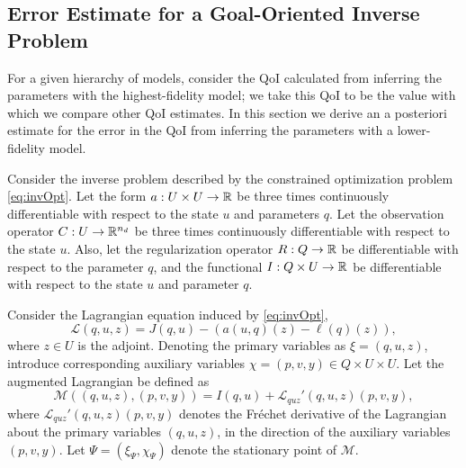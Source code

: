 \subsection[Error Estimate for a Goal-Oriented Inverse Problem]{Error Estimate for a Goal-Oriented Inverse Problem}  \label{sec:deriv}
%
For a given hierarchy of models, consider the QoI calculated from inferring the parameters with the highest-fidelity model; we take this QoI to be the value with which we compare other QoI estimates. In this section we derive an a posteriori estimate for the error in the QoI from inferring the parameters with a lower-fidelity model.
%
\begin{proposition}
\label{thm:error_estimate}
Consider the inverse problem described by the constrained optimization problem \cref{eq:invOpt}. Let the form $a:U \times U \to {\mathbb{R}}$ be three times continuously differentiable with respect to the state $u$ and parameters $q$. Let the observation operator $C:U\to{\mathbb{R}}^{n_d}$ be three times continuously differentiable with respect to the state $u$. Also, let the regularization operator $R:Q\to{\mathbb{R}}$ be differentiable with respect to the parameter $q$, and the functional $I:Q\times U\to{\mathbb{R}}$ be differentiable with respect to the state $u$ and parameter $q$.

Consider the Lagrangian equation induced by \cref{eq:invOpt},
%
\begin{equation}
\label{eq:InvsOpt_lag}
\mathcal{L}(q,u,z)= J(q,u)-(a(u,q)(z)-\ell(q)(z)),
\end{equation}
%
where $z\in U$ is the adjoint. Denoting the primary variables as $\xi=(q,u,z)$, introduce corresponding auxiliary variables $\chi=(p,v,y)\in Q\times U\times U$. Let the augmented Lagrangian be defined as
%
\begin{equation}
\label{eq:InvsOpt_auglag}
\mathcal{M}((q,u,z),(p,v,y)) = I(q,u) + \mathcal{L}_{quz}'(q,u,z)(p,v,y),
\end{equation}
%
where $\mathcal{L}_{quz}'(q,u,z)(p,v,y)$ denotes the Fr\'{e}chet derivative of the Lagrangian about the primary variables $(q,u,z)$, in the direction of the auxiliary variables $(p,v,y)$. Let $\Psi = (\xi_\Psi,\chi_\Psi)$ denote the stationary point of $\mathcal{M}$.


\end{proposition}
